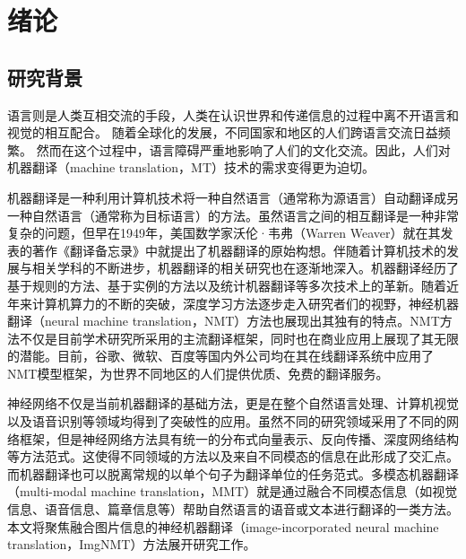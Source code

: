 \chapter{绪论}

\section{研究背景}
语言则是人类互相交流的手段，人类在认识世界和传递信息的过程中离不开语言和视觉的相互配合。
随着全球化的发展，不同国家和地区的人们跨语言交流日益频繁。
然而在这个过程中，语言障碍严重地影响了人们的文化交流。因此，人们对机器翻译（machine translation，MT）技术的需求变得更为迫切。

机器翻译是一种利用计算机技术将一种自然语言（通常称为源语言）自动翻译成另一种自然语言（通常称为目标语言）的方法。虽然语言之间的相互翻译是一种非常复杂的问题，但早在1949年，美国数学家沃伦·韦弗（Warren Weaver）就在其发表的著作《翻译备忘录》中就提出了机器翻译的原始构想。伴随着计算机技术的发展与相关学科的不断进步，机器翻译的相关研究也在逐渐地深入。机器翻译经历了基于规则的方法、基于实例的方法以及统计机器翻译等多次技术上的革新。随着近年来计算机算力的不断的突破，深度学习方法逐步走入研究者们的视野，神经机器翻译（neural machine translation，NMT）方法也展现出其独有的特点。NMT方法不仅是目前学术研究所采用的主流翻译框架，同时也在商业应用上展现了其无限的潜能。目前，谷歌、微软、百度等国内外公司均在其在线翻译系统中应用了NMT模型框架，为世界不同地区的人们提供优质、免费的翻译服务。

神经网络不仅是当前机器翻译的基础方法，更是在整个自然语言处理\citep{bengio2000neural,schwenk2007continuous,schwenk2010continuous,collobert2011deep}、计算机视觉\citep{krizhevsky2012imagenet,farabet2013learning,tompson2014joint,szegedy2014going}以及语音识别\citep{mikolov2011strategies,hinton2012deep,sainath2013improvements}等领域均得到了突破性的应用\citep{lecun2015deep}。虽然不同的研究领域采用了不同的网络框架，但是神经网络方法具有统一的分布式向量表示、反向传播、深度网络结构等方法范式。这使得不同领域的方法以及来自不同模态的信息在此形成了交汇点。而机器翻译也可以脱离常规的以单个句子为翻译单位的任务范式。多模态机器翻译（multi-modal machine translation，MMT）就是通过融合不同模态信息（如视觉信息、语音信息、篇章信息等）帮助自然语言的语音或文本进行翻译的一类方法。本文将聚焦融合图片信息的神经机器翻译（image-incorporated neural machine translation，ImgNMT）方法展开研究工作。

